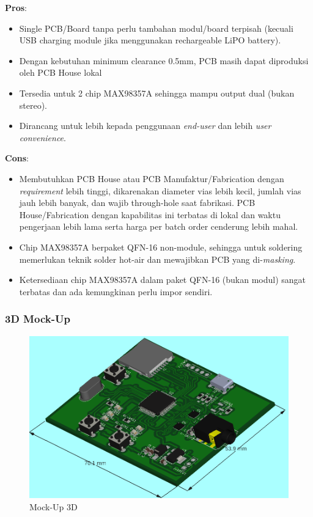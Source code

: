 \documentclass[12pt,]{article}
\begin{document}
	\textbf{Pros}:
	\begin{itemize}
		\item Single PCB/Board tanpa perlu tambahan modul/board terpisah
		(kecuali USB charging module jika menggunakan rechargeable LiPO battery).
		
		\item Dengan kebutuhan minimum clearance 0.5mm, PCB masih dapat diproduksi oleh PCB House lokal
		
		\item Tersedia untuk 2 chip MAX98357A sehingga mampu output dual (bukan stereo).
		
		\item Dirancang untuk lebih kepada penggunaan \textit{end-user} dan lebih \textit{user convenience}.
	\end{itemize}
	
	\textbf{Cons}:
	\begin{itemize}
		\item Membutuhkan PCB House atau PCB Manufaktur/Fabrication dengan \textit{requirement} lebih tinggi,
		dikarenakan diameter vias lebih kecil, jumlah vias jauh lebih banyak, dan wajib through-hole saat fabrikasi.
		PCB House/Fabrication dengan kapabilitas ini terbatas di lokal dan waktu pengerjaan lebih lama serta harga per batch order cenderung lebih mahal. 
		
		\item Chip MAX98357A berpaket QFN-16 non-module, sehingga untuk soldering memerlukan teknik solder hot-air dan mewajibkan PCB yang di-\textit{masking}.
	
		\item Ketersediaan chip MAX98357A dalam paket QFN-16 (bukan modul) sangat terbatas dan ada kemungkinan perlu impor sendiri.
	\end{itemize}

	\subsubsection{3D Mock-Up}
	\begin{figure}[!ht]
		\centering
		\includegraphics[width=400pt]{images/test3}
		\caption{Mock-Up 3D}
	\end{figure}
	
\end{document}
